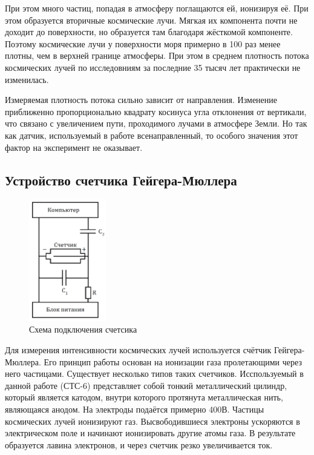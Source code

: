 \documentclass[12pt,a4paper]{article}
\begin{document}
При этом много частиц, попадая в атмосферу поглащаются ей, ионизируя её. При этом образуется вторичные космические лучи. Мягкая их компонента  почти не доходит до поверхности, но образуется там благодаря жёсткомой компоненте. Поэтому космические лучи у поверхности моря примерно в 100 раз менее плотны, чем в верхней границе атмосферы. При этом в среднем плотность потока космических лучей по исследовниям за последние 35 тысяч лет практически не изменилась. 

Измеряемая плотность потока сильно зависит от направления. Изменение приближенно пропорционально квадрату косинуса угла отклонения от вертикали, что связано с увеличением пути, проходимого лучами в атмосфере Земли. Но так как датчик, используемый в работе всенаправленный, то особого значения этот фактор на эксперимент не оказывает.

\subsection{ Устройство счетчика Гейгера-Мюллера}
\begin{figure}
\includegraphics[width=0.3\textwidth]{imgs/scheme.png}
\caption{Схема подключения счетсика}
\label{fig:scheme}
\end{figure}
Для измерения интенсивности  космических лучей используется счётчик Гейгера-Мюллера. Его принцип работы основан на ионизации газа пролетающими через него частицами. Существует несколько типов таких счетчиков. Исспользуемый в данной работе (СТС-6) представляет собой тонкий металлический цилиндр, который является катодом, внутри которого протянута металлическая нить, являющаяся анодом. На электроды подаётся примерно 400В. Частицы космических лучей ионизируют газ. Высвободившиеся электроны ускоряются в электрическом поле и начинают ионизировать другие атомы газа. В результате образуется лавина  электронов, и через счетчик резко увеличивается ток.
\end{document}
